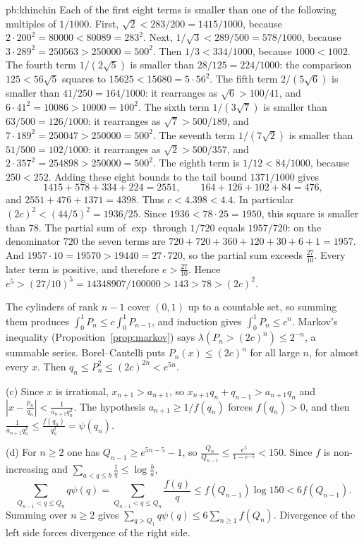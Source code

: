 \begin{solution}{pb:khinchin}
Each of the first eight terms is smaller than one of the following multiples of $1/1000$. First, $\sqrt2<283/200=1415/1000$, because $2\cdot200^2=80000<80089=283^2$. Next, $1/\sqrt3<289/500=578/1000$, because $3\cdot289^2=250563>250000=500^2$. Then $1/3<334/1000$, because $1000<1002$. The fourth term $1/(2\sqrt5)$ is smaller than $28/125=224/1000$: the comparison $125<56\sqrt5$ squares to $15625<15680=5\cdot56^2$. The fifth term $2/(5\sqrt6)$ is smaller than $41/250=164/1000$: it rearranges as $\sqrt6>100/41$, and $6\cdot41^2=10086>10000=100^2$. The sixth term $1/(3\sqrt7)$ is smaller than $63/500=126/1000$: it rearranges as $\sqrt7>500/189$, and $7\cdot189^2=250047>250000=500^2$. The seventh term $1/(7\sqrt2)$ is smaller than $51/500=102/1000$: it rearranges as $\sqrt2>500/357$, and $2\cdot357^2=254898>250000=500^2$. The eighth term is $1/12<84/1000$, because $250<252$. Adding these eight bounds to the tail bound $1371/1000$ gives
\[
1415+578+334+224=2551,\qquad 164+126+102+84=476,
\]
and $2551+476+1371=4398$. Thus $c<4.398<4.4$. In particular $(2c)^2<(44/5)^2=1936/25$. Since $1936<78\cdot25=1950$, this square is smaller than $78$. The partial sum of $\exp$ through $1/720$ equals $1957/720$: on the denominator $720$ the seven terms are $720+720+360+120+30+6+1=1957$. And $1957\cdot10=19570>19440=27\cdot720$, so the partial sum exceeds $\frac{27}{10}$. Every later term is positive, and therefore $e>\frac{27}{10}$. Hence $e^5>(27/10)^5=14348907/100000>143>78>(2c)^2$.

The cylinders of rank $n-1$ cover $(0,1)$ up to a countable set, so summing them produces $\int_0^1 P_n\le c\int_0^1 P_{n-1}$, and induction gives $\int_0^1 P_n\le c^n$. Markov's inequality (Proposition~\ref{prop:markov}) says $\lambda(P_n>(2c)^n)\le 2^{-n}$, a summable series. Borel--Cantelli puts $P_n(x)\le(2c)^n$ for all large $n$, for almost every $x$. Then $q_n\le P_n^2\le(2c)^{2n}<e^{5n}$.

(c) Since $x$ is irrational, $x_{n+1}>a_{n+1}$, so $x_{n+1}q_n+q_{n-1}>a_{n+1}q_n$ and $|x-\frac{p_n}{q_n}|<\frac1{a_{n+1}q_n^2}$. The hypothesis $a_{n+1}\ge 1/f(q_n)$ forces $f(q_n)>0$, and then $\frac1{a_{n+1}q_n^2}\le\frac{f(q_n)}{q_n^2}=\psi(q_n)$.

(d) For $n\ge 2$ one has $Q_{n-1}\ge e^{5n-5}-1$, so $\frac{Q_n}{Q_{n-1}}\le\frac{e^5}{1-e^{-5}}<150$. Since $f$ is non-increasing and $\sum_{a<q\le b}\frac1q\le\log\frac ba$,
\[
\sum_{Q_{n-1}<q\le Q_n}q\psi(q)=\sum_{Q_{n-1}<q\le Q_n}\frac{f(q)}q\le f(Q_{n-1})\log 150<6f(Q_{n-1}).
\]
Summing over $n\ge 2$ gives $\sum_{q>Q_1}q\psi(q)\le 6\sum_{n\ge 1}f(Q_n)$. Divergence of the left side forces divergence of the right side.


\end{solution}
